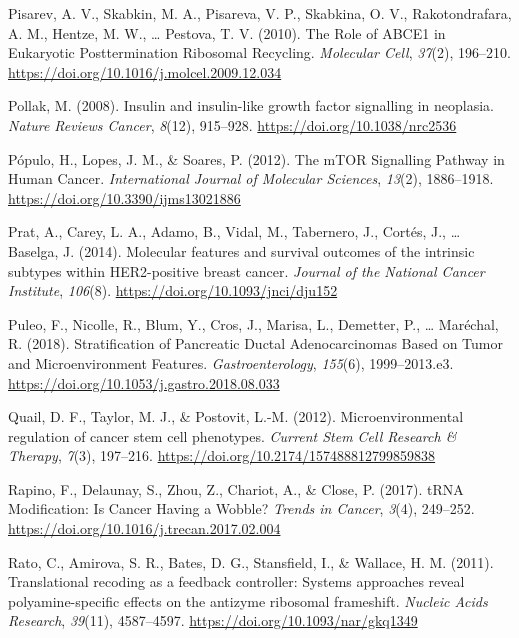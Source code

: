 \documentclass[12pt,openany]{book}
\begin{document}
\hypertarget{ref-Pisarev2010}{}
Pisarev, A. V., Skabkin, M. A., Pisareva, V. P., Skabkina, O. V.,
Rakotondrafara, A. M., Hentze, M. W., \ldots{} Pestova, T. V. (2010).
The Role of ABCE1 in Eukaryotic Posttermination Ribosomal Recycling.
\emph{Molecular Cell}, \emph{37}(2), 196--210.
\url{https://doi.org/10.1016/j.molcel.2009.12.034}

\hypertarget{ref-Pollak2008}{}
Pollak, M. (2008). Insulin and insulin-like growth factor signalling in
neoplasia. \emph{Nature Reviews Cancer}, \emph{8}(12), 915--928.
\url{https://doi.org/10.1038/nrc2536}

\hypertarget{ref-Populo2012}{}
Pópulo, H., Lopes, J. M., \& Soares, P. (2012). The mTOR Signalling
Pathway in Human Cancer. \emph{International Journal of Molecular
Sciences}, \emph{13}(2), 1886--1918.
\url{https://doi.org/10.3390/ijms13021886}

\hypertarget{ref-Prat2014}{}
Prat, A., Carey, L. A., Adamo, B., Vidal, M., Tabernero, J., Cortés, J.,
\ldots{} Baselga, J. (2014). Molecular features and survival outcomes of
the intrinsic subtypes within HER2-positive breast cancer. \emph{Journal
of the National Cancer Institute}, \emph{106}(8).
\url{https://doi.org/10.1093/jnci/dju152}

\hypertarget{ref-Puleo2018}{}
Puleo, F., Nicolle, R., Blum, Y., Cros, J., Marisa, L., Demetter, P.,
\ldots{} Maréchal, R. (2018). Stratification of Pancreatic Ductal
Adenocarcinomas Based on Tumor and Microenvironment Features.
\emph{Gastroenterology}, \emph{155}(6), 1999--2013.e3.
\url{https://doi.org/10.1053/j.gastro.2018.08.033}

\hypertarget{ref-Quail2012}{}
Quail, D. F., Taylor, M. J., \& Postovit, L.-M. (2012).
Microenvironmental regulation of cancer stem cell phenotypes.
\emph{Current Stem Cell Research \& Therapy}, \emph{7}(3), 197--216.
\url{https://doi.org/10.2174/157488812799859838}

\hypertarget{ref-Rapino2017}{}
Rapino, F., Delaunay, S., Zhou, Z., Chariot, A., \& Close, P. (2017).
tRNA Modification: Is Cancer Having a Wobble? \emph{Trends in Cancer},
\emph{3}(4), 249--252.
\url{https://doi.org/10.1016/j.trecan.2017.02.004}

\hypertarget{ref-Rato2011}{}
Rato, C., Amirova, S. R., Bates, D. G., Stansfield, I., \& Wallace, H.
M. (2011). Translational recoding as a feedback controller: Systems
approaches reveal polyamine-specific effects on the antizyme ribosomal
frameshift. \emph{Nucleic Acids Research}, \emph{39}(11), 4587--4597.
\url{https://doi.org/10.1093/nar/gkq1349}
\end{document}
